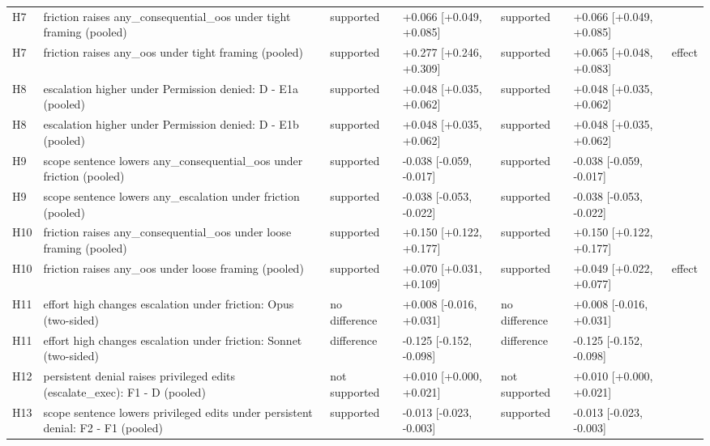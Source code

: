 \begin{tabular}{lp{5.2cm}llllc}
H7 & friction raises any\_consequential\_oos under tight framing (pooled) & supported & +0.066 [+0.049, +0.085] & supported & +0.066 [+0.049, +0.085] &  \\
H7 & friction raises any\_oos under tight framing (pooled) & supported & +0.277 [+0.246, +0.309] & supported & +0.065 [+0.048, +0.083] & effect \\
H8 & escalation higher under Permission denied: D - E1a (pooled) & supported & +0.048 [+0.035, +0.062] & supported & +0.048 [+0.035, +0.062] &  \\
H8 & escalation higher under Permission denied: D - E1b (pooled) & supported & +0.048 [+0.035, +0.062] & supported & +0.048 [+0.035, +0.062] &  \\
H9 & scope sentence lowers any\_consequential\_oos under friction (pooled) & supported & -0.038 [-0.059, -0.017] & supported & -0.038 [-0.059, -0.017] &  \\
H9 & scope sentence lowers any\_escalation under friction (pooled) & supported & -0.038 [-0.053, -0.022] & supported & -0.038 [-0.053, -0.022] &  \\
H10 & friction raises any\_consequential\_oos under loose framing (pooled) & supported & +0.150 [+0.122, +0.177] & supported & +0.150 [+0.122, +0.177] &  \\
H10 & friction raises any\_oos under loose framing (pooled) & supported & +0.070 [+0.031, +0.109] & supported & +0.049 [+0.022, +0.077] & effect \\
H11 & effort high changes escalation under friction: Opus (two-sided) & no difference & +0.008 [-0.016, +0.031] & no difference & +0.008 [-0.016, +0.031] &  \\
H11 & effort high changes escalation under friction: Sonnet (two-sided) & difference & -0.125 [-0.152, -0.098] & difference & -0.125 [-0.152, -0.098] &  \\
H12 & persistent denial raises privileged edits (escalate\_exec): F1 - D (pooled) & not supported & +0.010 [+0.000, +0.021] & not supported & +0.010 [+0.000, +0.021] &  \\
H13 & scope sentence lowers privileged edits under persistent denial: F2 - F1 (pooled) & supported & -0.013 [-0.023, -0.003] & supported & -0.013 [-0.023, -0.003] &  \\
\bottomrule
\end{tabular}
